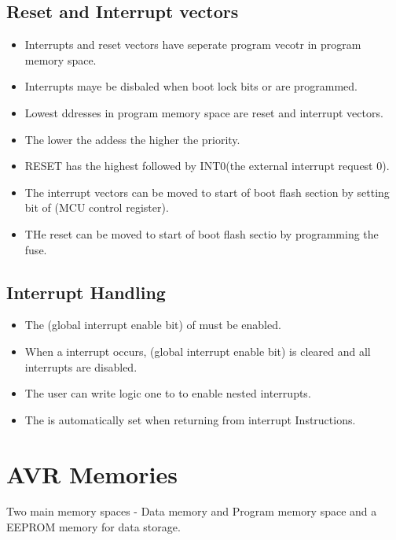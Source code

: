 \subsection{Reset and Interrupt vectors}
\begin{itemize}
    \item Interrupts and reset vectors have seperate program vecotr in program memory space.
    \item Interrupts maye be disbaled when boot lock bits  or  are programmed.
    \item Lowest ddresses in program memory space are reset and interrupt vectors.
    \item The lower the addess the higher the priority.
    \item RESET has the highest followed by INT0(the external interrupt request 0).
    \item The interrupt vectors can be moved to start of boot flash section by setting  bit of  (MCU control register).
    \item THe reset can be moved to start of boot flash sectio by programming the  fuse.
\end{itemize}

\subsection{Interrupt Handling}
\begin{itemize}
    \item The  (global interrupt enable bit) of  must be enabled.
    \item When a interrupt occurs,  (global interrupt enable bit) is cleared and all interrupts are disabled.
    \item The user can write logic one to  to enable nested interrupts.
    \item The  is automatically set when returning from interrupt Instructions.
\end{itemize}


\section{AVR Memories}
\quad Two main memory spaces - Data memory and Program memory space and a EEPROM memory for data storage.

